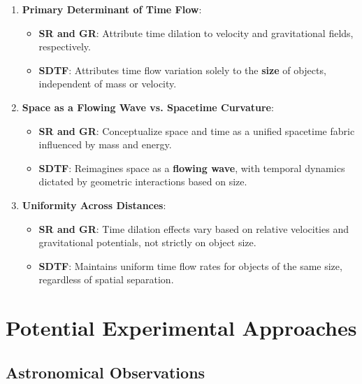 \documentclass[12pt]{article}
\begin{document}
\begin{enumerate}
    \item \textbf{Primary Determinant of Time Flow}:
    \begin{itemize}
        \item \textbf{SR and GR}: Attribute time dilation to velocity and gravitational fields, respectively.
        \item \textbf{SDTF}: Attributes time flow variation solely to the \textbf{size} of objects, independent of mass or velocity.
    \end{itemize}
    
    \item \textbf{Space as a Flowing Wave vs. Spacetime Curvature}:
    \begin{itemize}
        \item \textbf{SR and GR}: Conceptualize space and time as a unified spacetime fabric influenced by mass and energy.
        \item \textbf{SDTF}: Reimagines space as a \textbf{flowing wave}, with temporal dynamics dictated by geometric interactions based on size.
    \end{itemize}
    
    \item \textbf{Uniformity Across Distances}:
    \begin{itemize}
        \item \textbf{SR and GR}: Time dilation effects vary based on relative velocities and gravitational potentials, not strictly on object size.
        \item \textbf{SDTF}: Maintains uniform time flow rates for objects of the same size, regardless of spatial separation.
    \end{itemize}
\end{enumerate}

\section{Potential Experimental Approaches}

\subsection{Astronomical Observations}
\end{document}
